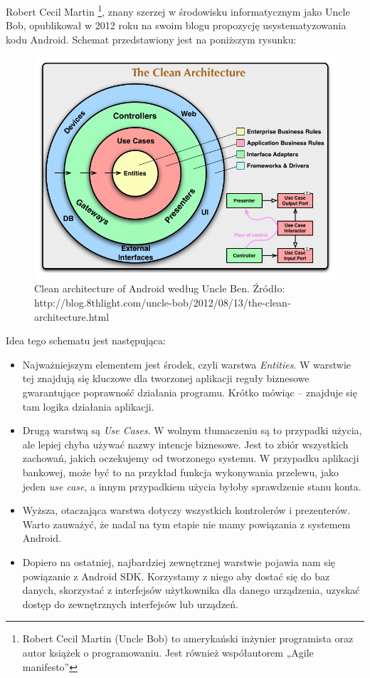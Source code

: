 Robert Cecil Martin \footnote{Robert Cecil Martin (Uncle Bob) to amerykański inżynier programista oraz autor książek o programowaniu. Jest również współautorem „Agile manifesto”}, znany szerzej w środowisku informatycznym jako Uncle Bob, opublikował w 2012 roku na swoim blogu propozycję usystematyzowania kodu Android. Schemat przedstawiony jest na poniższym rysunku:

\begin{figure}[!htb]
    \centering
    \includegraphics[width=13cm]{imgs/ch4_clean_architecture.jpg}
    \caption
{Clean architecture of Android według Uncle Ben. Źródło: http://blog.8thlight.com/uncle-bob/2012/08/13/the-clean-architecture.html}
    \label{fig:clean architecture}
\end{figure} 

Idea tego schematu jest następująca:

\begin{itemize}

\item
Najważniejszym elementem jest środek, czyli warstwa \textit{Entities}. W warstwie tej znajdują się kluczowe dla tworzonej aplikacji reguły biznesowe gwarantujące poprawność działania programu. Krótko mówiąc – znajduje się tam logika działania aplikacji.
\item
Drugą warstwą są \textit{Use Cases}. W wolnym tłumaczeniu są to przypadki użycia, ale lepiej chyba używać nazwy intencje biznesowe. Jest to zbiór wszystkich zachowań, jakich oczekujemy od tworzonego systemu. W przypadku aplikacji bankowej, może być to na przykład funkcja wykonywania przelewu, jako jeden \textit{use case}, a innym przypadkiem użycia byłoby sprawdzenie stanu konta.
\item
Wyższa, otaczająca warstwa dotyczy wszystkich kontrolerów i prezenterów. Warto zauważyć, że nadal na tym etapie nie mamy powiązania z systemem Android.
\item
Dopiero na ostatniej, najbardziej zewnętrznej warstwie pojawia nam się powiązanie z Android SDK. Korzystamy z niego aby dostać się do baz danych, skorzystać z interfejsów użytkownika dla danego urządzenia, uzyskać dostęp do zewnętrznych interfejsów lub urządzeń.
\end{itemize}

